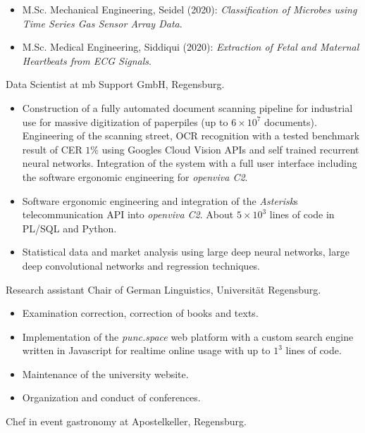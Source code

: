 \documentclass[a4paper, 11pt]{article}
\newcommand{\years}[1]{\marginnote{\scriptsize #1}}
\begin{document}
\begin{itemize}
\begin{itemize}[noitemsep, leftmargin=*]
\begin{itemize}
						\item M.Sc. Mechanical Engineering, Seidel (2020): \emph{Classification of
							Microbes using Time Series Gas Sensor Array Data}.

						\item M.Sc. Medical Engineering, Siddiqui (2020): \emph{Extraction of
							Fetal and Maternal Heartbeats from ECG Signals}.
					\end{itemize}
			\end{itemize}
	\end{itemize}
	\years{2015--18} Data Scientist at mb Support GmbH, Regensburg.
	\begin{itemize}
		\item Construction of a fully automated document scanning pipeline for industrial use for massive digitization of paperpiles (up to $6 \times 10^7$ documents). Engineering of the scanning street, OCR recognition with a tested benchmark result of CER $1\%$ using Googles Cloud Vision APIs and self trained recurrent neural networks. Integration of the system with a full user interface including the software ergonomic engineering for \emph{openviva C2}.

		\item Software ergonomic engineering and integration of the \emph{Asterisk}s telecommunication API into \emph{openviva C2}. About $5 \times 10^3$ lines of code in PL/SQL and Python.

		\item Statistical data and market analysis using large deep neural networks, large deep convolutional networks and regression techniques.
	\end{itemize}
	\years{2013--15} Research assistant Chair of German Linguistics, Universität
	Regensburg.
	\begin{itemize}
		\item Examination correction, correction of books and texts.

		\item Implementation of the \emph{punc.space} web platform with a custom search engine written in Javascript for realtime online usage with up to $1^3$ lines of code.

		\item Maintenance of the university website.

		\item Organization and conduct of conferences.
	\end{itemize}
	\years{2012--15} Chef in event gastronomy at Apostelkeller, Regensburg.
\end{document}
